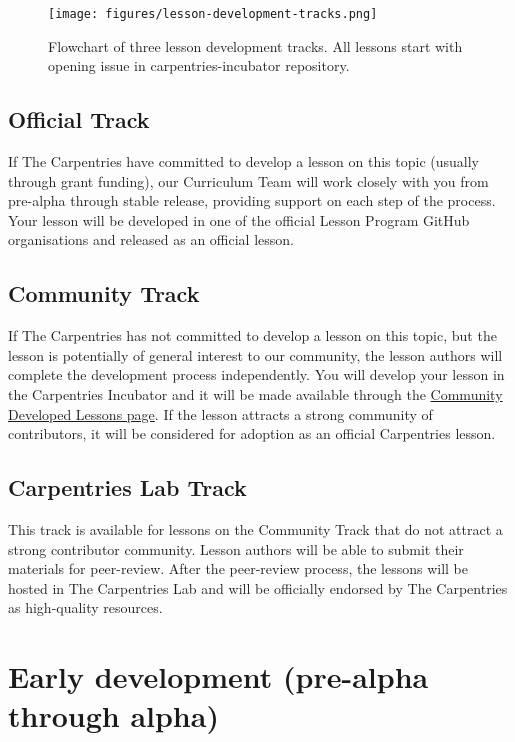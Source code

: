 \documentclass[
]{book}
\begin{document}
\begin{figure}
\centering
\texttt{[image: figures/lesson-development-tracks.png]}
\caption{Flowchart of three lesson development tracks. All lessons start with opening issue in carpentries-incubator repository.}
\end{figure}

\hypertarget{official-track}{%
\subsection{Official Track}\label{official-track}}

If The Carpentries have committed to develop a lesson
on this topic (usually through grant funding), our
Curriculum Team will work closely with you from
pre-alpha through stable release, providing support on
each step of the process. Your lesson will be
developed in one of the official Lesson Program GitHub
organisations and released as an official lesson.

\hypertarget{community-track}{%
\subsection{Community Track}\label{community-track}}

If The Carpentries has not committed to develop a
lesson on this topic, but the lesson is potentially of
general interest to our community, the lesson authors
will complete the development process independently.
You will develop
your lesson in the Carpentries Incubator and it will be
made available through the \href{https://carpentries.org/community-lessons/}{Community Developed Lessons page}.
If the lesson attracts a strong community
of contributors, it will be considered for adoption
as an official Carpentries lesson.

\hypertarget{carpentries-lab-track}{%
\subsection{Carpentries Lab Track}\label{carpentries-lab-track}}

This track is available for lessons on the Community
Track that do not attract a strong contributor
community. Lesson authors will be able to submit their
materials for peer-review. After the peer-review
process, the lessons will be hosted in The Carpentries
Lab and will be officially endorsed by The Carpentries
as high-quality resources.

\hypertarget{early-development-pre-alpha-through-alpha}{%
\section{Early development (pre-alpha through alpha)}\label{early-development-pre-alpha-through-alpha}}
\end{document}
